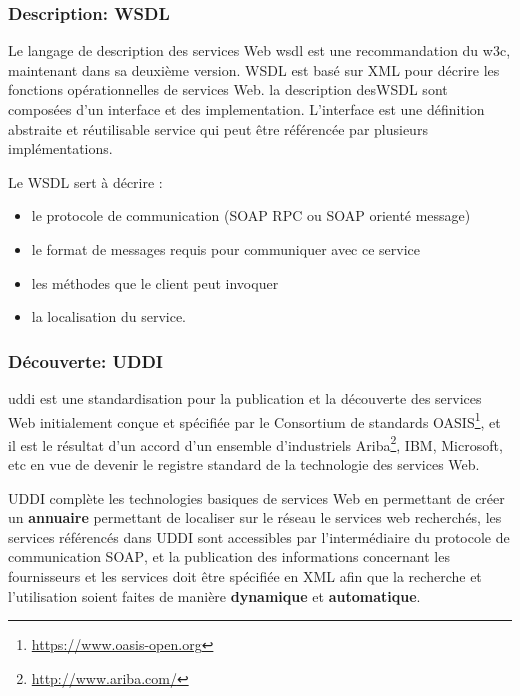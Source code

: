 	\subsubsection{Description: WSDL}
	Le langage de description des services Web \acrshort{wsdl} \cite{chinnici2007web} est une recommandation du
	\acrshort{w3c}, maintenant dans sa deuxième version.  \textsc{WSDL} est basé sur \textsc{XML}
	pour décrire les fonctions opérationnelles de services Web. la description des\textsc{WSDL} sont 
	composées d'un interface et des implementation. L'interface est une définition abstraite et 
	réutilisable service qui peut être référencée par plusieurs implémentations. 	

	Le WSDL sert à décrire :
	\renewcommand{\labelitemi}{$\bullet$}
	\begin{itemize} %
	    \item le protocole de communication (SOAP RPC ou SOAP orienté message)
	    \item le format de messages requis pour communiquer avec ce service
	    \item les méthodes que le client peut invoquer
	    \item la localisation du service.
	\end{itemize}
	\subsubsection{Découverte: UDDI}
	\acrshort{uddi} \cite{clement2004uddi} est une standardisation pour la publication et la découverte 
	des services Web initialement conçue et spécifiée par le Consortium de standards OASIS\footnote{\url{https://www.oasis-open.org}},
	et il est le résultat d'un accord d'un ensemble d’industriels Ariba\footnote{\url{http://www.ariba.com/}}, 
	IBM, Microsoft, etc en vue de devenir le registre standard de la technologie des services Web.

	\textsc{UDDI} complète les technologies basiques de services Web en permettant de créer un \textbf{annuaire} 
	permettant de localiser sur le réseau le services web recherchés, les services référencés dans \textsc{UDDI} 
	sont accessibles par l'intermédiaire du protocole de communication \textsc{SOAP}, et la publication des 
	informations concernant les fournisseurs et les services doit être spécifiée en \textsc{XML} afin que la 
	recherche et l'utilisation soient faites de manière \textbf{dynamique} et \textbf{automatique}.

